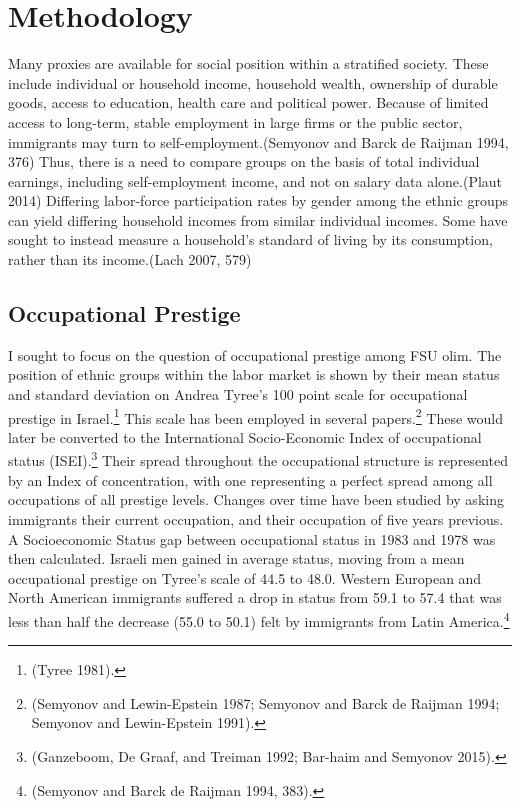 \documentclass[12pt,twoside]{reedthesis}
\begin{document}
  \chapter{Methodology}\label{sec:orgheadline7}
  
  Many proxies are available for social position within a stratified
  society. These include individual or household income, household wealth,
  ownership of durable goods, access to education, health care and
  political power. Because of limited access to long-term, stable
  employment in large firms or the public sector, immigrants may turn to
  self-employment.(Semyonov and Barck de Raijman 1994, 376) Thus, there is
  a need to compare groups on the basis of total individual earnings,
  including self-employment income, and not on salary data alone.(Plaut
  2014) Differing labor-force participation rates by gender among the
  ethnic groups can yield differing household incomes from similar
  individual incomes. Some have sought to instead measure a household's
  standard of living by its consumption, rather than its income.(Lach
  2007, 579)
  
  \section{Occupational Prestige}\label{sec:orgheadline5}
  
  I sought to focus on the question of occupational prestige among FSU
  olim. The position of ethnic groups within the labor market is shown by
  their mean status and standard deviation on Andrea Tyree's 100 point
  scale for occupational prestige in Israel.\footnote{(Tyree 1981).} This
  scale has been employed in several papers.\footnote{(Semyonov and
    Lewin-Epstein 1987; Semyonov and Barck de Raijman 1994; Semyonov and
    Lewin-Epstein 1991).} These would later be converted to the
  International Socio-Economic Index of occupational status
  (ISEI).\footnote{(Ganzeboom, De Graaf, and Treiman 1992; Bar-haim and
    Semyonov 2015).} Their spread throughout the occupational structure is
  represented by an Index of concentration, with one representing a
  perfect spread among all occupations of all prestige levels. Changes
  over time have been studied by asking immigrants their current
  occupation, and their occupation of five years previous. A Socioeconomic
  Status gap between occupational status in 1983 and 1978 was then
  calculated. Israeli men gained in average status, moving from a mean
  occupational prestige on Tyree's scale of 44.5 to 48.0. Western European
  and North American immigrants suffered a drop in status from 59.1 to
  57.4 that was less than half the decrease (55.0 to 50.1) felt by
  immigrants from Latin America.\footnote{(Semyonov and Barck de Raijman
    1994, 383).}
  
\end{document}
